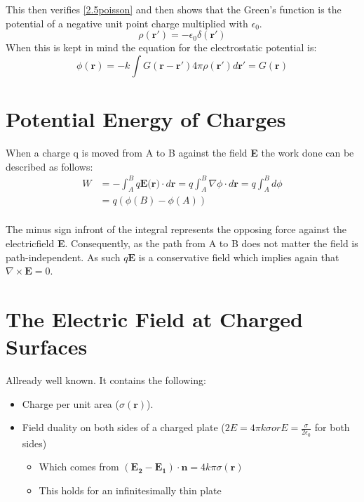 \noindent This then verifies \ref{2.5poisson} and then shows that the Green's function is the potential of a negative unit point charge multiplied with $\epsilon_0$.
\begin{equation}
    \rho(\textbf{r}') = -\epsilon_0 \delta(\textbf{r}')
\end{equation}
When this is kept in mind the equation for the electrostatic potential is:
\begin{equation}
    \phi(\textbf{r})= -k \int G(\textbf{r}-\textbf{r}')4 \pi \rho(\textbf{r}') d \textbf{r}' = G(\textbf{r})
\end{equation}
\section{Potential Energy of Charges}
When a charge q is moved from A to B against the field \textbf{E} the work done can be described as follows:
\begin{equation}
    \begin{aligned}
        W &= - \int_A^B q\textbf{E(r)} \cdot d\textbf{r} = q\int_A^B \nabla\phi \cdot d\textbf{r} =  q\int_A^B d\phi \\    
          &= q(\phi(B)-\phi(A))\\
    \end{aligned}
\end{equation}

\noindent The minus sign infront of the integral represents the opposing force against the electricfield \textbf{E}. Consequently, as the path from A to B does not matter the field
is path-independent. As such $q\textbf{E}$ is a conservative field which implies again that $\nabla \times \textbf{E} = 0$.

\section{The Electric Field at Charged Surfaces}
Allready well known. It contains the following:

\begin{itemize}
    \item Charge per unit area ($\sigma (\textbf{r})$).
    \item Field duality on both sides of a charged plate ($2E = 4\pi k \sigma or E = \frac{\sigma}{2 \epsilon_0}$ for both sides)
    \begin{itemize}
        \item Which comes from $(\mathbf{E_{2}} - \mathbf{E_{1}}) \cdot \mathbf{n} = 4 k \pi \sigma (\mathbf{r}) $
        \item This holds for an infinitesimally thin plate
    \end{itemize}
\end{itemize}

